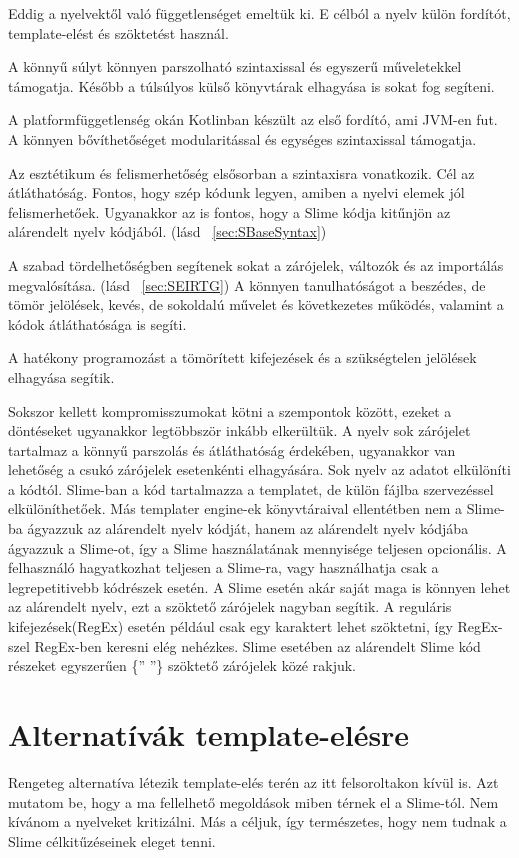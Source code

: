 Eddig a nyelvektől való függetlenséget emeltük ki. 
E célból a nyelv külön fordítót, template-elést és szöktetést használ.

A könnyű súlyt könnyen parszolható szintaxissal és egyszerű műveletekkel támogatja. 
Később a túlsúlyos külső könyvtárak elhagyása is sokat fog segíteni.

A platformfüggetlenség okán Kotlinban készült az első fordító, ami JVM-en fut. 
A könnyen bővíthetőséget modularitással és egységes szintaxissal támogatja.

Az esztétikum és felismerhetőség elsősorban a szintaxisra vonatkozik. 
Cél az átláthatóság. 
Fontos, hogy szép kódunk legyen, amiben a nyelvi elemek jól felismerhetőek.
Ugyanakkor az is fontos, hogy a Slime kódja kitűnjön az alárendelt nyelv kódjából. (lásd ~\ref{sec:SBaseSyntax})

A szabad tördelhetőségben segítenek sokat a zárójelek, változók és az importálás megvalósítása. (lásd ~\ref{sec:SEIRTG}) 
A könnyen tanulhatóságot a beszédes, de tömör jelölések, kevés, de sokoldalú művelet és következetes működés, valamint a kódok átláthatósága is segíti.

A hatékony programozást a tömörített kifejezések és a szükségtelen jelölések elhagyása segítik.

Sokszor kellett kompromisszumokat kötni a szempontok között, ezeket a döntéseket ugyanakkor legtöbbször inkább elkerültük. 
A nyelv sok zárójelet tartalmaz a könnyű parszolás és átláthatóság érdekében, ugyanakkor van lehetőség a csukó zárójelek esetenkénti elhagyására.
Sok nyelv az adatot elkülöníti a kódtól. 
Slime-ban a kód tartalmazza a templatet, de külön fájlba szervezéssel elkülöníthetőek. 
Más templater engine-ek könyvtáraival ellentétben nem a Slime-ba ágyazzuk az alárendelt nyelv kódját, hanem  
az alárendelt nyelv kódjába ágyazzuk a Slime-ot, így a Slime használatának mennyisége teljesen opcionális. 
A felhasználó hagyatkozhat teljesen a Slime-ra, vagy használhatja csak a legrepetitivebb kódrészek esetén. 
A Slime esetén akár saját maga is könnyen lehet az alárendelt nyelv, ezt a szöktető zárójelek nagyban segítik. 
A reguláris kifejezések(RegEx) esetén például csak egy karaktert lehet szöktetni, így RegEx-szel RegEx-ben keresni elég nehézkes.
Slime esetében az alárendelt Slime kód részeket egyszerűen \{” ”\} szöktető zárójelek közé rakjuk.


\section{Alternatívák template-elésre }
\label{sec:SAlternatives}
Rengeteg alternatíva létezik template-elés terén az itt felsoroltakon kívül is. 
Azt mutatom be, hogy a ma fellelhető megoldások miben térnek el a Slime-tól.
Nem kívánom a nyelveket kritizálni.
Más a céljuk, így természetes, hogy nem tudnak a Slime célkitűzéseinek eleget tenni.

